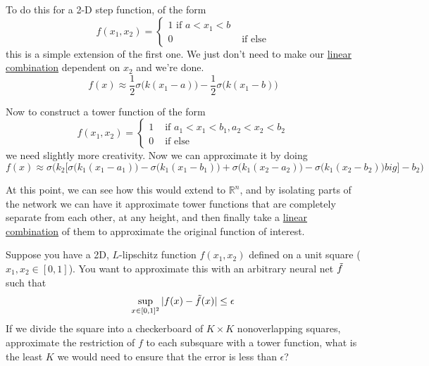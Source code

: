   \begin{example}
    \label{ex:bump-functions-in-r2}
    To do this for a 2-D step function, of the form 
    \begin{equation}
      f(x_1, x_2) = \begin{cases} 1 \text{ if } a < x_1 < b \\ 0 & \text{ if else} \end{cases}
    \end{equation}
    this is a simple extension of the first one. We just don't need to make our \hyperref[lin-def:linear-combination]{linear combination} dependent on $x_2$ and we're done.
    \begin{equation}
      f(x) \approx \frac{1}{2} \sigma \big( k( x_1 - a)\big) - \frac{1}{2} \sigma \big( k (x_1 - b) \big)
    \end{equation}
  \end{example} 

  \begin{example}
    \label{ex:tower-functions-in-r2}
 
    Now to construct a tower function of the form 
    \begin{equation}
      f(x_1, x_2) = \begin{cases} 1 & \text{ if } a_1 < x_1 < b_1, a_2 < x_2 < b_2 \\ 0 & \text{ if else} \end{cases}
    \end{equation}
    we need slightly more creativity. Now we can approximate it by doing 
    \begin{equation}
      f(x) \approx \sigma \bigg( k_2 \big[ \sigma\big( k_1 (x_1 - a_1)\big) - \sigma\big( k_1 (x_1 -b_1)\big) + \sigma \big( k_1 (x_2 - a_2)\big) - \sigma\big(k_1 (x_2 - b_2)\big)  big] - b_2\bigg)
    \end{equation}
  \end{example} 

  At this point, we can see how this would extend to $\mathbb{R}^n$, and by isolating parts of the network we can have it approximate tower functions that are completely separate from each other, at any height, and then finally take a \hyperref[lin-def:linear-combination]{linear combination} of them to approximate the original function of interest.  

  \begin{theorem}[CS671 Fall 2023 PS5]
    \label{thm:cs671-fall-2023-ps5}
    Suppose you have a 2D, $L$-lipschitz function $f(x_1, x_2)$ defined on a unit square ($x_1, x_2 \in \left [0,1 \right ]$). You want to approximate this with an arbitrary neural net $\Tilde{f}$ such that
    \begin{equation}
      \sup_{x \in [0, 1]^2} |f(x) - \Tilde{f}(x)| \leq \epsilon
    \end{equation}
    If we divide the square into a checkerboard of $K \times K$ nonoverlapping squares, approximate the restriction of $f$ to each subsquare with a tower function, what is the least $K$ we would need to ensure that the error is less than $\epsilon$? 
  \end{theorem} 


